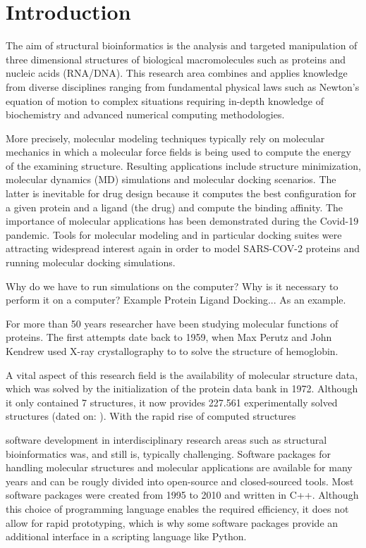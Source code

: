 \section{Introduction}


The aim of structural bioinformatics is the analysis and targeted manipulation of three dimensional structures of biological macromolecules such as proteins and nucleic acids (RNA/DNA).
This research area combines and applies knowledge from diverse disciplines ranging from fundamental physical laws such as Newton's equation of motion to complex situations requiring in-depth knowledge of biochemistry and advanced numerical computing methodologies.



More precisely, molecular modeling techniques typically rely on molecular mechanics in which a molecular force fields is being used to compute the energy of the examining structure.  
Resulting applications include structure minimization, molecular dynamics (MD) simulations and molecular docking scenarios. The latter is inevitable for drug design because it computes the best configuration for a given protein and a ligand (the drug) and compute the binding affinity. 
The importance of molecular applications has been demonstrated during the Covid-19 pandemic. Tools for molecular modeling and in particular docking suites were attracting widespread interest again in order to model SARS-COV-2 proteins and running molecular docking simulations. 





Why do we have to run simulations on the computer? Why is it necessary to perform it on a computer? Example Protein Ligand Docking... As an example.

For more than 50 years researcher have been studying molecular functions of proteins. 
The first attempts date back to 1959, when Max Perutz and John Kendrew used X-ray crystallography to to solve the structure of hemoglobin. 

A vital aspect of this research field is the availability of molecular structure data, which was solved by the initialization of the protein data bank in 1972. Although it only contained 7 structures, it now provides 227.561 experimentally solved structures (dated on:  ). With the rapid rise of computed structures 

software development in interdisciplinary research areas such as structural bioinformatics was, and still is, typically challenging.
Software packages for handling molecular structures and molecular applications are available for many years and can be rougly divided into open-source and closed-sourced tools. Most software packages were created from 1995 to 2010 and written in C++. Although this choice of programming language enables the required efficiency, it does not allow for rapid prototyping, which is why
some software packages provide an additional interface in a scripting language like Python. 

